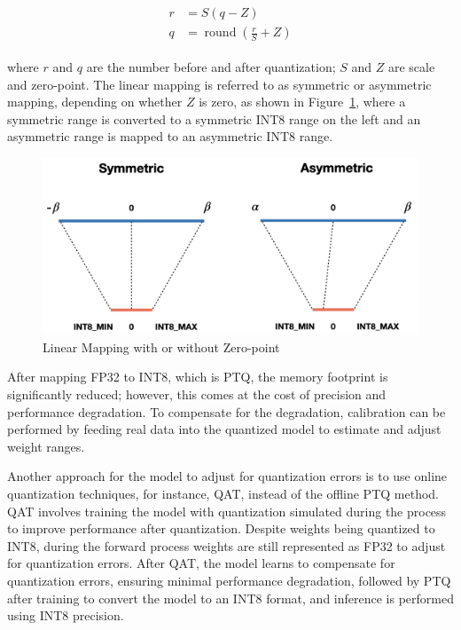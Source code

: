 \begin{gather}
\begin{split}
    r &= S(q-Z) \\
    q &= \operatorname{round}\left(\frac{r}{S} + Z\right)
\end{split}
\end{gather}

where $r$ and $q$ are the number before and after quantization; $S$ and $Z$ are scale and zero-point.
The linear mapping is referred to as symmetric or asymmetric mapping, depending on whether $Z$ is zero,
as shown in Figure~\ref{fig:sub4}, where a symmetric range is converted to
a symmetric INT8 range on the left and an asymmetric range is mapped to an asymmetric INT8 range.

\begin{figure}[hbpt]
    \centering
    \includegraphics[width=\linewidth]{images/0.003}
    \caption{Linear Mapping with or without Zero-point}
    \label{fig:sub4}
\end{figure}

After mapping FP32 to INT8, which is PTQ, the memory footprint is significantly reduced;
however, this comes at the cost of precision and performance degradation.
To compensate for the degradation, calibration can be performed by feeding real data
into the quantized model to estimate and adjust weight ranges.

Another approach for the model to adjust for quantization errors is to use online quantization techniques,
for instance, QAT, instead of the offline PTQ method.
QAT involves training the model with quantization simulated during the process to improve performance after quantization.
Despite weights being quantized to INT8, during the forward process weights are still represented as FP32 to adjust for quantization errors.
After QAT, the model learns to compensate for quantization errors, ensuring minimal performance degradation,
followed by PTQ after training to convert the model to an INT8 format, and inference is performed using INT8 precision.

